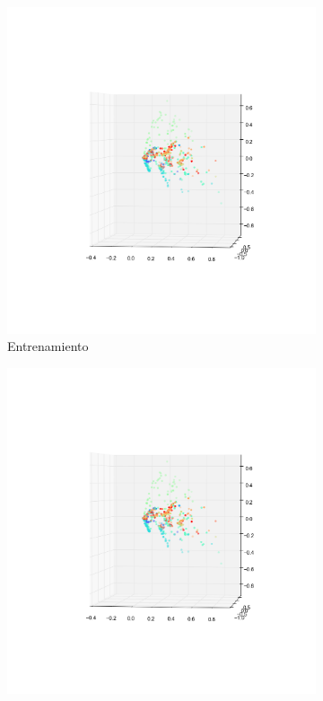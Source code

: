 \begin{figure}[H]
        \begin{subfigure}[b]{0.5\textwidth}
                \includegraphics[width=\linewidth]{secciones/graficos/oja/1_train.png}
                \caption{Entrenamiento}
                \label{fig: ej1_oja_3d_1_train}
        \end{subfigure}%
        \begin{subfigure}[b]{0.5\textwidth}
                \includegraphics[width=\linewidth]{secciones/graficos/oja/1_train.png}

\end{subfigure}
\end{figure}

